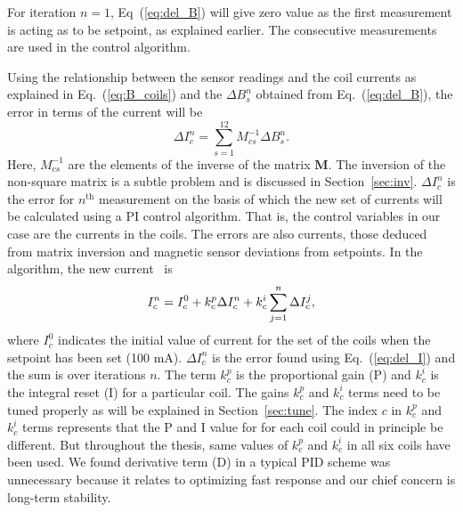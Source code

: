 For iteration $n=1$, Eq~(\ref{eq:del_B}) will give zero value as the first measurement is acting as to be setpoint, as explained earlier. The consecutive measurements are used in the control algorithm. 

Using the relationship between the sensor readings and the coil currents as explained in Eq.~(\ref{eq:B_coils}) and the $\Delta B_s^n$ obtained from Eq.~(\ref{eq:del_B}), the error in terms of the current  will be
\begin{equation}\label{eq:del_I}
    \Delta I_c^n =\sum_{s=1}^{12} M^{-1}_{cs} \Delta B_s^n\text{.}
\end{equation}
Here, $M^{-1}_{cs}$ are the elements of the inverse of the matrix $\bm{M}$. The inversion of the non-square matrix is a subtle problem and is discussed in Section~\ref{sec:inv}. $\Delta I_c^n$ is the error for $n^{\mathrm{th}}$ measurement on the basis of which the new set of currents will be calculated using a PI control algorithm. That is, the control variables in our case are the currents in the coils. The errors are also currents, those deduced from matrix inversion and magnetic sensor deviations from setpoints. In the algorithm, the new current~\cite{bea} is
\begin{equation}\label{eq:I}
    I^n_c=I^0_c+k^p_c \Delta I_c^n+k^i_c\sum_{j=1}^n \Delta I_c^j{\rm ,}
\end{equation}
where $I^0_c$ indicates the initial value of current for the set of the coils when the setpoint has been set (100 mA). $\Delta I_c^n$ is the error found using Eq.~(\ref{eq:del_I}) and the sum is over iterations $n$. The term $k^p_c$ is the proportional gain (P) and $k^i_c$ is the integral reset (I) for a particular coil. The gains $k^p_c$ and $k^i_c$ terms need to be tuned properly as will be explained in Section~\ref{sec:tune}. The index $c$ in $k^p_c$ and $k^i_c$ terms represents that the P and I value for for each coil could in principle be different. But throughout the thesis, same values of $k_c^p$ and $k_c^i$ in all six coils have been used. We found derivative term (D) in a typical PID scheme was unnecessary because it relates to optimizing fast response and our chief concern is long-term stability.


